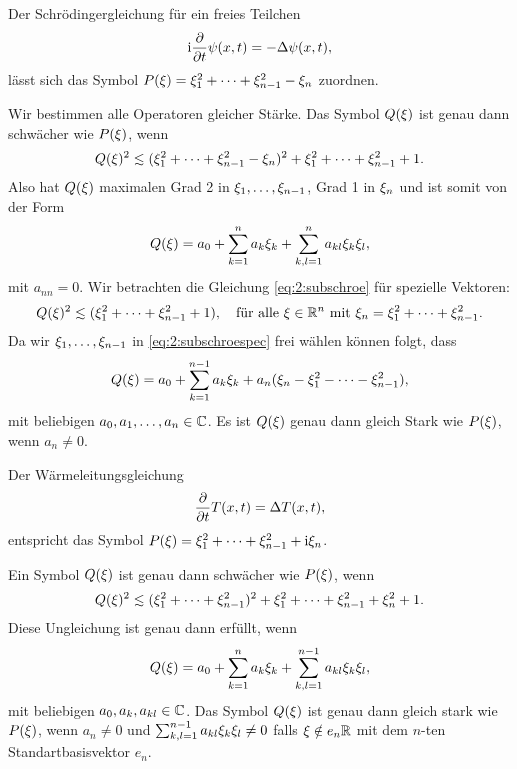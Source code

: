 \begin{exa}\label{exa:2:schroe}
Der Schrödingergleichung für ein freies Teilchen
\begin{equation}
\mathrm i\frac{\partial}{\partial t}\psi(x,t)=-\Delta\psi(x,t),\end{equation}
lässt sich das Symbol $P(\xi)=\xi^2_1+\dots+\xi^2_{n-1}-\xi_n$ zuordnen.

Wir bestimmen alle Operatoren gleicher Stärke.
Das Symbol $Q(\xi)$ ist genau dann schwächer wie $P(\xi)$,
wenn
\begin{equation}\label{eq:2:subschroe}
Q(\x)^2\apprle(\x^2_1+\dots+\x^2_{n-1}-\x_n)^2+\x^2_1+\dots+\x^2_{n-1}+1.
\end{equation}
Also hat $Q(\xi)$ maximalen Grad 2 in $\xi_1,\dots,\xi_{n-1}$,
Grad 1 in $\xi_n$ und ist somit von der Form
\begin{equation}
Q(\xi)=a_0+\sum^n_{k=1}a_k\xi_k+\sum^n_{k,l=1}a_{kl}\xi_k\xi_l,
\end{equation}
mit $a_{nn}=0$.
Wir betrachten die Gleichung \eqref{eq:2:subschroe}
für spezielle Vektoren:
\begin{equation}\label{eq:2:subschroespec}
Q(\x)^2\apprle(\x^2_1+\dots+\x^2_{n-1}+1),
\quad\text{für alle}~\x\in\R^n~\text{mit}~\x_n=\x^2_1+\dots+\x^2_{n-1}.
\end{equation}
Da wir $\xi_1,\dots,\xi_{n-1}$ in \eqref{eq:2:subschroespec} frei wählen können folgt, dass
\begin{equation}
Q(\xi)=a_0+\sum_{k=1}^{n-1}a_k\xi_k+a_n(\xi_n-\xi^2_1-\dots-\xi^2_{n-1}),
\end{equation}
mit beliebigen $a_0,a_1,\dots,a_n\in\mathbb C$.
Es ist $Q(\xi)$ genau dann gleich Stark wie $P(\xi)$,
wenn $a_n\neq0$.
\end{exa}

\begin{exa}\label{exa:2:heat}
Der Wärmeleitungsgleichung
\begin{equation}
\frac{\partial}{\partial t}T(x,t)=\Delta T(x,t),
\end{equation}
entspricht das Symbol $P(\xi)=\xi^2_1+\dots+\xi^2_{n-1}+\mathrm i\xi_n$.

Ein Symbol $Q(\xi)$ ist genau dann schwächer wie $P(\xi)$, wenn
\begin{equation}
Q(\x)^2\apprle(\x^2_1+\dots+\x^2_{n-1})^2+\x^2_1+\dots+\x^2_{n-1}+\x^2_n+1.
\end{equation}
Diese Ungleichung ist genau dann erfüllt, wenn
\begin{equation}
Q(\xi)=a_0+\sum_{k=1}^na_k\xi_k+\sum_{k,l=1}^{n-1}a_{kl}\xi_k\xi_l,
\end{equation}
mit beliebigen $a_0,a_k,a_{kl}\in\mathbb C$.
Das Symbol $Q(\xi)$ ist genau dann gleich stark wie $P(\xi)$,
wenn $a_n\neq0$ und $\sum_{k,l=1}^{n-1}a_{kl}\xi_k\xi_l\neq0$ falls $\xi\notin e_n\mathbb R$
mit dem $n$-ten Standartbasisvektor $e_n$.
\end{exa}


